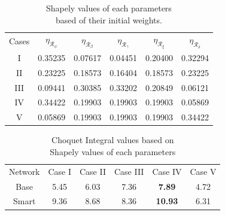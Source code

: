 \begin{table}[h]
    \centering
    \caption{Shapely values of each parameters \\ based of their initial weights.}
    \begin{tabular}{c|c|c|c|c|c}
    \hline
          Cases & $\eta_{\mathcal{R}_\psi}$ & $\eta_{\mathcal{R}_\beta}$ & $\eta_{\mathcal{R}_\gamma}$ & $\eta_{\mathcal{R}_\xi}$ & $\eta_{\mathcal{R}_\delta}$  \\
    \hhline{======}
         I & 0.35235 & 0.07617 & 0.04451 & 0.20400 & 0.32294 \\
    \hline
         II & 0.23225 & 0.18573 & 0.16404 & 0.18573 & 0.23225 \\ 
    \hline
         III & 0.09441 & 0.30385 & 0.33202 & 0.20849 & 0.06121 \\ 
    \hline
         IV & 0.34422 & 0.19903 & 0.19903 & 0.19903 & 0.05869 \\ 
    \hline
         V & 0.05869 & 0.19903 & 0.19903 & 0.19903 & 0.34422\\
    \hline
    \end{tabular}
    \label{tab:shapely}
\end{table}

\begin{table}[h]
    \centering
    \caption{Choquet Integral values based on \\ Shapely values of each parameters}
    \begin{tabular}{c|c|c|c|c|c}
        Network & Case I    &   Case II   & Case III & Case IV & Case V  \\
    \hhline{======}
        Base  & 5.45 & 6.03 & 7.36 & \textbf{7.89} & 4.72 \\
    \hline
        Smart & 9.36 & 8.68 & 8.36 & \textbf{10.93} & 6.31 \\ 
    \hline
    \end{tabular}
    \label{tab:CI_resilience}
\end{table}

